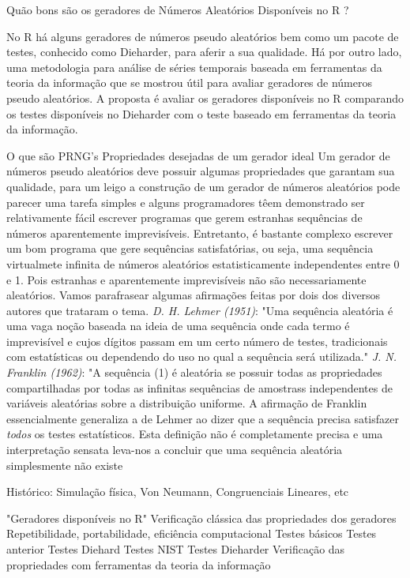 
Quão bons são os geradores de Números Aleatórios Disponíveis no R ?


No R há alguns geradores de números pseudo aleatórios bem como um pacote de testes, conhecido como Dieharder, para aferir a sua qualidade.
Há por outro lado, uma metodologia para análise de séries temporais baseada em ferramentas da teoria da informação que se mostrou útil para avaliar geradores de números pseudo aleatórios.
A proposta é avaliar os geradores disponíveis no R comparando os testes disponíveis no Dieharder com o teste baseado em ferramentas da teoria da informação.

O que são PRNG's
  Propriedades desejadas de um gerador ideal
    Um gerador de números pseudo aleatórios deve possuir algumas propriedades que garantam sua qualidade, para um leigo a construção de um gerador de números aleatórios pode parecer uma tarefa simples e alguns programadores têem demonstrado ser relativamente fácil escrever programas que gerem estranhas sequências de números aparentemente imprevisíveis. Entretanto, é bastante complexo escrever um bom programa que gere sequências satisfatórias, ou seja, uma sequência virtualmete infinita de números aleatórios estatisticamente independentes entre 0 e 1. Pois estranhas e aparentemente imprevisíveis não são necessariamente aleatórios.\cite{Sibley:88}
    Vamos parafrasear algumas afirmações feitas por dois dos diversos autores que trataram o tema.
      \textit{D. H. Lehmer (1951)}: "Uma sequência aleatória é uma vaga noção baseada na ideia de uma sequência onde cada termo é imprevisível e cujos dígitos passam em um certo número de testes, tradicionais com estatísticas ou dependendo do uso no qual a sequência será utilizada."
      \textit{J. N. Franklin (1962)}: "A sequência (1) é aleatória se possuir todas as propriedades compartilhadas por todas as infinitas sequências de amostrass independentes de variáveis aleatórias sobre a distribuição uniforme.
    A afirmação de Franklin essencialmente generaliza a de Lehmer ao dizer que a sequência precisa satisfazer \textit{todos} os testes estatísticos. Esta definição não é completamente precisa e uma interpretação sensata leva-nos a concluir que uma sequência aleatória simplesmente não existe
    
    
  Histórico: Simulação física, Von Neumann, Congruenciais Lineares, etc
    
  "Geradores disponíveis no R"
Verificação clássica das propriedades dos geradores
  Repetibilidade, portabilidade, eficiência computacional
  Testes básicos
  Testes anterior
  Testes Diehard
  Testes NIST
  Testes Dieharder
Verificação das propriedades com ferramentas da teoria da informação


  